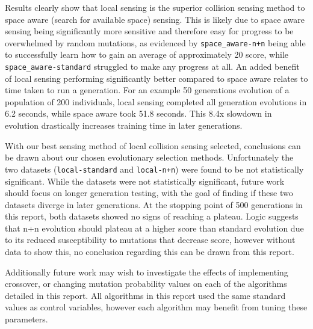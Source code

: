 Results clearly show that local sensing is the superior collision sensing method to space aware (search for available space) sensing. This is likely due to space aware sensing being significantly more sensitive and therefore easy for progress to be overwhelmed by random mutations, as evidenced by \verb|space_aware-n+n| being able to successfully learn how to gain an average of approximately 20 score, while \verb|space_aware-standard| struggled to make any progress at all. An added benefit of local sensing performing significantly better compared to space aware relates to time taken to run a generation. For an example 50 generations evolution of a population of 200 individuals, local sensing completed all generation evolutions in 6.2 seconds, while space aware took 51.8 seconds. This 8.4x slowdown in evolution drastically increases training time in later generations.

With our best sensing method of local collision sensing selected, conclusions can be drawn about our chosen evolutionary selection methods. Unfortunately the two datasets (\verb|local-standard| and \verb|local-n+n|) were found to be not statistically significant. While the datasets were not statistically significant, future work should focus on longer generation testing, with the goal of finding if these two datasets diverge in later generations. At the stopping point of 500 generations in this report, both datasets showed no signs of reaching a plateau. Logic suggests that n+n evolution should plateau at a higher score than standard evolution due to its reduced susceptibility to mutations that decrease score, however without data to show this, no conclusion regarding this can be drawn from this report.

Additionally future work may wish to investigate the effects of implementing crossover, or changing mutation probability values on each of the algorithms detailed in this report. All algorithms in this report used the same standard values as control variables, however each algorithm may benefit from tuning these parameters.